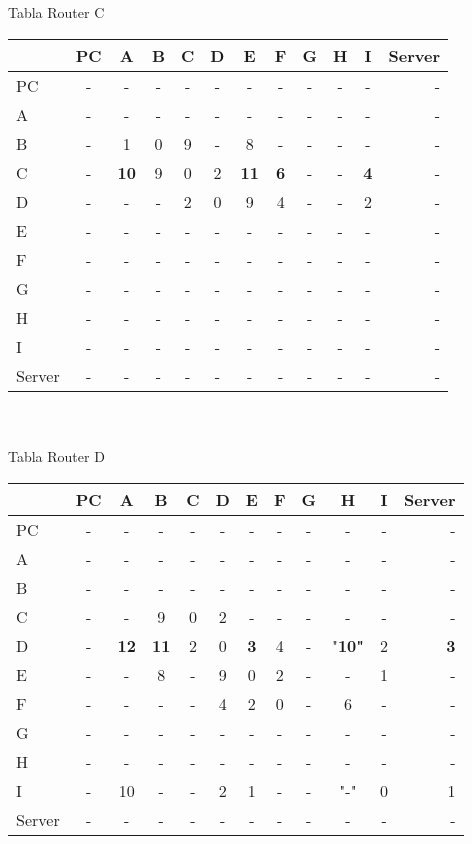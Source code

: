\documentclass{article}
\begin{document}
\\
\\
Tabla Router C \\
\begin{tabular}{l*{10}{c}r}
              & PC & A & B & C & D & E & F & G & H & I & Server \\
\hline
PC             & - & - & - & - & - & - & - & - & - & - & -\\
A              & - & - & - & - & - & - & - & - & - & - & -\\
B              & - & 1 & 0 & 9 & - & 8 & - & - & - & - & -\\
C              & - &\bf{10}& 9 & 0 & 2 &\bf{11}&\bf{6}& - & - &\bf{4}& -\\
D              & - & - & - & 2 & 0 & 9 & 4 & - & - & 2 & -\\
E              & - & - & - & - & - & - & - & - & - & - & -\\
F              & - & - & - & - & - & - & - & - & - & - & -\\
G              & - & - & - & - & - & - & - & - & - & - & -\\
H              & - & - & - & - & - & - & - & - & - & - & -\\
I              & - & - & - & - & - & - & - & - & - & - & -\\
Server         & - & - & - & - & - & - & - & - & - & - & -\\
\end{tabular}
\\
\\
Tabla Router D	 \\
\begin{tabular}{l*{10}{c}r}
              & PC & A & B & C & D & E & F & G & H & I & Server \\
\hline
PC             & - & - & - & - & - & - & - & - & - & - & -\\
A              & - & - & - & - & - & - & - & - & - & - & -\\
B              & - & - & - & - & - & - & - & - & - & - & -\\
C              & - & - & 9 & 0 & 2 & - & - & - & - & - & -\\
D              & - &\bf{12}&\bf{11}& 2 & 0 &\bf{3}& 4 & - &"\bf{10}"& 2 &\bf{3}\\
E              & - & - & 8 & - & 9 & 0 & 2 & - & - & 1 & -\\
F              & - & - & - & - & 4 & 2 & 0 & - & 6 & - & -\\
G              & - & - & - & - & - & - & - & - & - & - & -\\
H              & - & - & - & - & - & - & - & - & - & - & -\\
I              & - & 10 & - & - & 2 & 1 & - & - & "-" & 0 & 1\\
Server         & - & - & - & - & - & - & - & - & - & - & -\\

\end{tabular}\\
\end{document}

